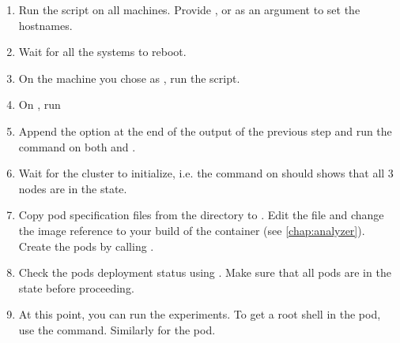 \begin{enumerate}
    \item Run the  script on all machines. Provide ,  or  as an argument to set the hostnames.

    \item Wait for all the systems to reboot.

    \item On the machine you chose as , run the  script.

    \item On , run 

    \item Append the  option at the end of the output of the previous step and run the command on both  and .

    \item Wait for the cluster to initialize, i.e. the command  on  should shows that all 3 nodes are in the  state.

    \item Copy pod specification files from the  directory to . Edit the  file and change the image reference to your build of the  container (see \cref{chap:analyzer}). Create the pods by calling .

    \item Check the pods deployment status using . Make sure that all pods are in the  state before proceeding.

    \item At this point, you can run the experiments. To get a root shell in the  pod, use the  command. Similarly for the  pod.
\end{enumerate}